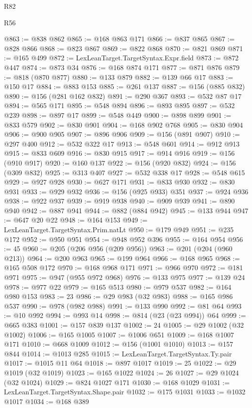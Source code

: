 \begin{lexlean}{R82}
\begin{lexlean}{R56}
\begin{coremodule}
{{{{{{{{{{{{{{{{{{{{{{{{{{{{{{{{{{{{{{{{{{{{{{{{{{{{{{{{{{{{{{{{{{{{{{{{{{{{{{{{{{{{{{{{{{{{{{{{{{{{{{{{{{{{{{{{{{{{{{{{{{{{{{{{{{{{{{{{{{{{{{{{{{{{{{{{{{{{{{{{{{{{{{{{{{{{{{{{{{{{{{{{{{{{{{{{{{{{{{{{{{{{{{{{{{{@863 := @838 @862
@865 := @168 @863 @171
@866 := @837 @865
@867 := @828 @866
@868 := @823 @867
@869 := @822 @868
@870 := @821 @869
@871 := @165 @499
@872 := LexLeanTarget.TargetSyntax.Expr.field
@873 := @872 @447
@874 := @873 @34
@876 := @168 @874 @171
@877 := @871 @876
@879 := @818 (@870 @877)
@880 := @133 @879
@882 := @139 @66 @17
@883 := @150 @17
@884 := @883 @153
@885 := @261 @137
@887 := @156 (@885 @832)
@890 := @156 (@281 @162 @832)
@891 := @290 @367
@893 := @532 @87 @17
@894 := @565 @171
@895 := @548 @894
@896 := @893 @895
@897 := @532 @239
@898 := @897 @17
@899 := @548 @449
@900 := @898 @899
@901 := @833 @579
@902 := @830 @901
@904 := @168 @902 @768
@905 := @830 @904
@906 := @900 @905
@907 := @896 @906
@909 := @156 (@891 @907)
@910 := @297 @400
@912 := @532 @322 @17
@913 := @548 @601
@914 := @912 @913
@915 := @833 @609
@916 := @830 @915
@917 := @914 @916
@919 := @156 (@910 @917)
@920 := @160 @137
@922 := @156 (@920 @832)
@924 := @156 (@309 @832)
@925 := @313 @407
@927 := @532 @338 @17
@928 := @548 @615
@929 := @927 @928
@930 := @627 @171
@931 := @833 @930
@932 := @830 @931
@933 := @929 @932
@936 := @156 (@925 @933) @351
@937 := @924 @936
@938 := @922 @937
@939 := @919 @938
@940 := @909 @939
@941 := @890 @940
@942 := @887 @941
@944 := @882 (@884 @942)
@945 := @133 @944
@947 := @647 @20 @22
@948 := @164 @153
@949 := LexLeanTarget.TargetSyntax.Prim.natLt
@950 := @179 @949
@951 := @235 @172
@952 := @950 @951
@954 := @948 @952 @396
@955 := @164 @954
@956 := 45
@960 := @205 (@206 @956 (@209 @956))
@963 := @201 (@204 (@960 @213))
@964 := @200 @963
@965 := @199 @964
@966 := @168 @965
@968 := @165 @508 @172
@970 := @168 @968 @171
@971 := @966 @970
@972 := @181 @971
@975 := @947 (@955 @972 @968)
@976 := @133 @975
@977 := @139 @24
@978 := @977 @22
@979 := @165 @513
@980 := @979 @537
@982 := @164 @980 @153
@983 := 23
@986 := @29 @983 (@32 @983)
@988 := @165 @986 @537
@990 := @978 (@982 @988)
@991 := @133 @990
@992 := @81 @64
@993 := @10 @992
@994 := @993 @14
@998 := @814 (@23 (@23 @994)) @64
@999 := @665 @383
@1001 := @157 @839 @137
@1002 := 24
@1005 := @29 @1002 (@32 @1002)
@1006 := @165 @1005
@1007 := @1006 @651
@1009 := @168 @1007 @171
@1010 := @668 @1009
@1012 := @156 (@1001 @1010)
@1013 := @157 @844
@1014 := @1013 @285
@1015 := LexLeanTarget.TargetSyntax.Ty.pair
@1017 := @1015 @11 @64
@1018 := @897 @1017
@1019 := 25
@1022 := @29 @1019 (@32 @1019)
@1023 := @165 @1022
@1024 := 26
@1027 := @29 @1024 (@32 @1024)
@1029 := @824 @1027 @171
@1030 := @168 @1029
@1031 := LexLeanTarget.TargetSyntax.Shape.pair
@1032 := @175 @1031
@1033 := @1032 @1017
@1034 := @168 @389
}}}}}}}}}}}}}}}}}}}}}}}}}}}}}}}}}}}}}}}}}}}}}}}}}}}}}}}}}}}}}}}}}}}}}}}}}}}}}}}}}}}}}}}}}}}}}}}}}}}}}}}}}}}}}}}}}}}}}}}}}}}}}}}}}}}}}}}}}}}}}}}}}}}}}}}}}}}}}}}}}}}}}}}}}}}}}}}}}}}}}}}}}}}}}}}}}}}}}}}}}}}}}}}}}}}
\end{coremodule}
\end{lexlean}
\end{lexlean}
